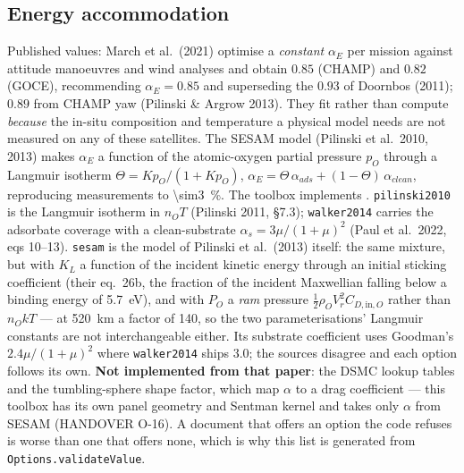 \subsection{Energy accommodation}
Published values: March et al.\ (2021) optimise a \emph{constant} $\alpha_E$ per mission against attitude manoeuvres and wind analyses and obtain $0.85$ (CHAMP) and $0.82$ (GOCE), recommending $\alpha_E=0.85$ and superseding the $0.93$ of Doornbos (2011); $0.89$ from CHAMP yaw (Pilinski \& Argrow 2013). They fit rather than compute \emph{because} the in-situ composition and temperature a physical model needs are not measured on any of these satellites. The SESAM model (Pilinski et al.\ 2010, 2013) makes $\alpha_E$ a function of the atomic-oxygen partial pressure $p_O$ through a Langmuir isotherm $\Theta=Kp_O/(1+Kp_O)$, $\alpha_E=\Theta\,\alpha_{ads}+(1-\Theta)\,\alpha_{clean}$, reproducing measurements to \SI{\sim3}{\percent}. The toolbox implements \ngfoptdragaccommodation. \texttt{pilinski2010} is the Langmuir isotherm in $n_O T$ (Pilinski 2011, \S7.3); \texttt{walker2014} carries the adsorbate coverage with a clean-substrate $\alpha_s=3\mu/(1+\mu)^2$ (Paul et al.\ 2022, eqs 10--13). \texttt{sesam} is the model of Pilinski et al.\ (2013) itself: the same mixture, but with $K_L$ a function of the incident kinetic energy through an initial sticking coefficient (their eq.~26b, the fraction of the incident Maxwellian falling below a binding energy of \SI{5.7}{\electronvolt}), and with $P_O$ a \emph{ram} pressure $\tfrac12\rho_O V_r^2 C_{D,\mathrm{in},O}$ rather than $n_O k T$ --- at \SI{520}{\kilo\metre} a factor of 140, so the two parameterisations' Langmuir constants are not interchangeable either. Its substrate coefficient uses Goodman's $2.4\mu/(1+\mu)^2$ where \texttt{walker2014} ships $3.0$; the sources disagree and each option follows its own. \textbf{Not implemented from that paper}: the DSMC lookup tables and the tumbling-sphere shape factor, which map $\alpha$ to a drag coefficient --- this toolbox has its own panel geometry and Sentman kernel and takes only $\alpha$ from SESAM (HANDOVER O-16). A document that offers an option the code refuses is worse than one that offers none, which is why this list is generated from \texttt{Options.validateValue}.

